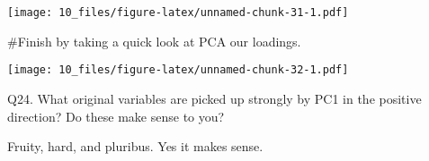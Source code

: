 \documentclass[
]{article}
\newenvironment{Shaded}{\begin{snugshade}}{\end{snugshade}}
\newcommand{\AttributeTok}[1]{\textcolor[rgb]{0.13,0.29,0.53}{#1}}
\newcommand{\DecValTok}[1]{\textcolor[rgb]{0.00,0.00,0.81}{#1}}
\newcommand{\FunctionTok}[1]{\textcolor[rgb]{0.13,0.29,0.53}{\textbf{#1}}}
\newcommand{\NormalTok}[1]{#1}
\newcommand{\SpecialCharTok}[1]{\textcolor[rgb]{0.81,0.36,0.00}{\textbf{#1}}}
\newcommand{\StringTok}[1]{\textcolor[rgb]{0.31,0.60,0.02}{#1}}
\begin{document}
\texttt{[image: 10\_files/figure-latex/unnamed-chunk-31-1.pdf]}

\#Finish by taking a quick look at PCA our loadings.

\begin{Shaded}
\end{Shaded}

\texttt{[image: 10\_files/figure-latex/unnamed-chunk-32-1.pdf]}

Q24. What original variables are picked up strongly by PC1 in the
positive direction? Do these make sense to you?

Fruity, hard, and pluribus. Yes it makes sense.
\end{document}

